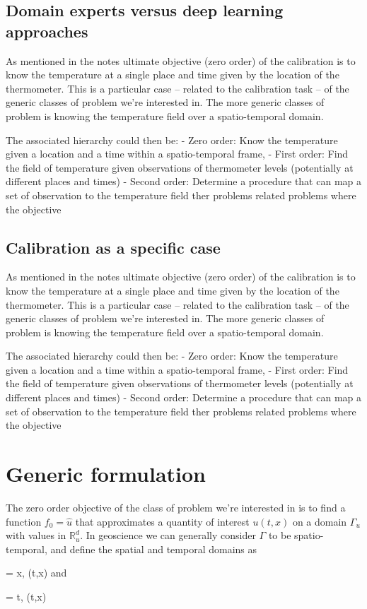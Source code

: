 \begin{bibunit}
\subsection{Domain experts versus deep learning approaches}

  As mentioned in the notes ultimate objective (zero order) of the calibration is to know the temperature at a single place and time given by the location of the thermometer. 
  This is a particular case  -- related to the calibration task  -- of the generic classes of problem we're interested in.
  The more generic classes of problem is knowing the temperature field over a spatio-temporal domain.

The associated hierarchy could then be:
  - Zero order: Know the temperature given a location and a time within a spatio-temporal frame, 
  - First order: Find the field of temperature given observations of thermometer levels (potentially at different places and times)
  - Second order: Determine a procedure that can map a set of observation to the temperature field
ther problems related problems where the objective 


\subsection{Calibration as a specific case}
  As mentioned in the notes ultimate objective (zero order) of the calibration is to know the temperature at a single place and time given by the location of the thermometer. 
  This is a particular case  -- related to the calibration task  -- of the generic classes of problem we're interested in.
  The more generic classes of problem is knowing the temperature field over a spatio-temporal domain.

The associated hierarchy could then be:
  - Zero order: Know the temperature given a location and a time within a spatio-temporal frame, 
  - First order: Find the field of temperature given observations of thermometer levels (potentially at different places and times)
  - Second order: Determine a procedure that can map a set of observation to the temperature field
ther problems related problems where the objective 


\section{Generic formulation}

  The zero order objective of the class of problem we're interested in is to find a function $f_0=\hat{u}$  that approximates a quantity of interest $u(t, x)$ on a domain $\Gamma_u$ with values in $\mathbb{R}^d_u$. 
  In geoscience we can generally consider $\Gamma$ to be spatio-temporal, and define the spatial and temporal domains  as {\Omega = {x, (t,x) \in \Gamma} and {\Tau = {t, (t,x) \in \Gamma}

}}
\end{bibunit}
